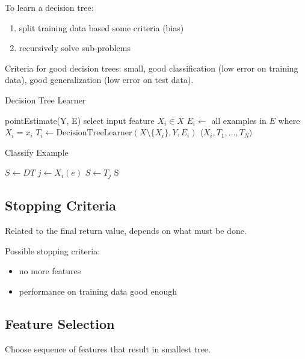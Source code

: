 \documentclass[11pt]{article}
\begin{document}
To learn a decision tree:
\begin{enumerate}
\item split training data based some criteria (bias)
\item recursively solve sub-problems
\end{enumerate}

Criteria for good decision trees: small, good classification (low error on training data), good generalization (low error on test data).

\begin{algorithm}
\caption{Decision Tree Learner}
\begin{algorithmic}[1]
        \State \Return pointEstimate(Y, E)
    \Else
        \State select input feature \( X_i \in X \)
            \State \( E_i \gets \) all examples in \( E \) where \( X_i = x_i \)
            \State \( T_i \gets \text{DecisionTreeLearner}(X \setminus \{X_i\}, Y, E_i) \)
        \EndFor
        \State \Return \( \langle X_i, T_1, \ldots, T_N \rangle \)
    \EndIf
\EndProcedure
\end{algorithmic}
\end{algorithm}

\begin{algorithm}
\caption{Classify Example}
\begin{algorithmic}[1]
    \State \( S \gets DT \)
        \State \( j \gets X_i(e) \)
        \State \( S \gets T_j \)
    \EndWhile
    \State \Return S
\EndProcedure
\end{algorithmic}
\end{algorithm}
\subsection{Stopping Criteria}
\label{sec:org1ed547c}
Related to the final return value, depends on what must be done.

Possible stopping criteria:
\begin{itemize}
\item no more features
\item performance on training data good enough
\end{itemize}
\subsection{Feature Selection}
\label{sec:orgd81a515}
Choose sequence of features that result in smallest tree.
\end{document}
